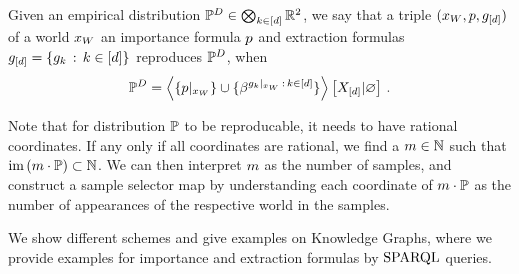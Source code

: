 \begin{definition}
    Given an empirical distribution $\mathbb{P}^{D}\in\bigotimes_{k\in[d]}\mathbb{R}^2$, we say that a triple $(x_{W},p,g_{[d]})$ of a \firstOrderLogic{} world $x_{W}$ an importance formula $p$ and extraction formulas $g_{[d]}=\{g_{k}\,:\,k\in[d]\}$ reproduces $\mathbb{P}^{D}$, when
    \begin{align*}
        \mathbb{P}^{D}
        = \left\langle \{{p}|_{x_{W}}\}\cup\{\beta^{{g_{k}}|_{x_{W}}\, : \, k\in[d]}\}\right\rangle \left[ X_{[d]} | \varnothing \right] \, .
    \end{align*}
\end{definition}

Note that for distribution $\mathbb{P}$ to be reproducable, it needs to have rational coordinates. %
If any only if all coordinates are rational, we find a $m\in\mathbb{N}$ such that $\mathrm{im}\left(m\cdot\mathbb{P}\right)\subset\mathbb{N}$.
We can then interpret $m$ as the number of samples, and construct a sample selector map by understanding each coordinate of $m\cdot\mathbb{P}$ as the number of appearances of the respective world in the samples.

We show different schemes and give examples on Knowledge Graphs, where we provide examples for importance and extraction formulas by $\mathrm{SPARQL}$ queries.


%



